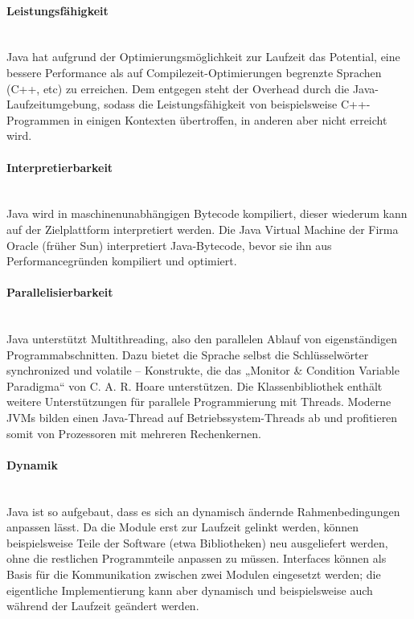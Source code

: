 \paragraph{Leistungsfähigkeit}\ \\
Java hat aufgrund der Optimierungsmöglichkeit zur Laufzeit das Potential, eine bessere Performance als auf Compilezeit-Optimierungen begrenzte Sprachen (C++, etc) zu erreichen. Dem entgegen steht der Overhead durch die Java-Laufzeitumgebung, sodass die Leistungsfähigkeit von beispielsweise C++-Programmen in einigen Kontexten übertroffen, in anderen aber nicht erreicht wird.

\paragraph{Interpretierbarkeit}\ \\
Java wird in maschinenunabhängigen Bytecode kompiliert, dieser wiederum kann auf der Zielplattform interpretiert werden. Die Java Virtual Machine der Firma Oracle (früher Sun) interpretiert Java-Bytecode, bevor sie ihn aus Performancegründen kompiliert und optimiert.

\paragraph{Parallelisierbarkeit}\ \\
Java unterstützt Multithreading, also den parallelen Ablauf von eigenständigen Programmabschnitten. Dazu bietet die Sprache selbst die Schlüsselwörter synchronized und volatile – Konstrukte, die das „Monitor \& Condition Variable Paradigma“ von C. A. R. Hoare unterstützen. Die Klassenbibliothek enthält weitere Unterstützungen für parallele Programmierung mit Threads. Moderne JVMs bilden einen Java-Thread auf Betriebssystem-Threads ab und profitieren somit von Prozessoren mit mehreren Rechenkernen.

\paragraph{Dynamik}\ \\
Java ist so aufgebaut, dass es sich an dynamisch ändernde Rahmenbedingungen anpassen lässt. Da die Module erst zur Laufzeit gelinkt werden, können beispielsweise Teile der Software (etwa Bibliotheken) neu ausgeliefert werden, ohne die restlichen Programmteile anpassen zu müssen. Interfaces können als Basis für die Kommunikation zwischen zwei Modulen eingesetzt werden; die eigentliche Implementierung kann aber dynamisch und beispielsweise auch während der Laufzeit geändert werden.\\
\\
\cite{shit_java_wiki}

